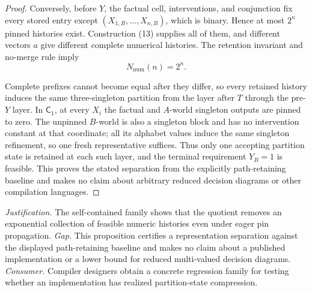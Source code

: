 \documentclass{article}
\begin{document}
\begin{proof}
Conversely, before \(Y\), the factual cell, interventions, and conjunction fix every stored entry except \((X_{1,B},\ldots,X_{n,B})\), which is binary. Hence at most \(2^n\) pinned histories exist. Construction (13) supplies all of them, and different vectors \(a\) give different complete numerical histories. The retention invariant and no-merge rule imply
\[
 N_{\mathrm{num}}(n)=2^n.
\]

Complete prefixes cannot become equal after they differ, so every retained history induces the same three-singleton partition from the layer after \(T\) through the pre-\(Y\) layer. In \(\mathsf C_1\), at every \(X_i\) the factual and \(A\)-world singleton outputs are pinned to zero. The unpinned \(B\)-world is also a singleton block and has no intervention constant at that coordinate; all its alphabet values induce the same singleton refinement, so one fresh representative suffices. Thus only one accepting partition state is retained at each such layer, and the terminal requirement \(Y_B=1\) is feasible. This proves the stated separation from the explicitly path-retaining baseline and makes no claim about arbitrary reduced decision diagrams or other compilation languages.
\end{proof}
\par\smallskip\noindent \textit{Justification.} The self-contained family shows that the quotient removes an exponential collection of feasible numeric histories even under eager pin propagation. \textit{Gap.} This proposition certifies a representation separation against the displayed path-retaining baseline and makes no claim about a published implementation or a lower bound for reduced multi-valued decision diagrams. \textit{Consumer.} Compiler designers obtain a concrete regression family for testing whether an implementation has realized partition-state compression.
\end{document}
